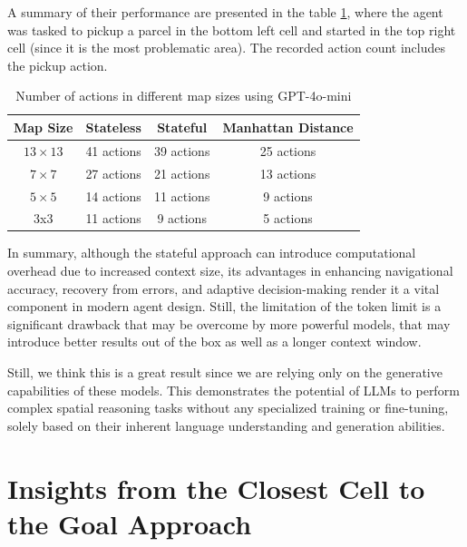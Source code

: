 A summary of their performance are presented in the table \ref{tab:svss}, where
the agent was tasked to pickup a parcel in the bottom left cell and started in
the top right cell (since it is the most problematic area). The recorded action count
includes the pickup action.

\vspace{5mm}
\begin{table}[ht]
  \centering
  \begin{tabular}{c|cc|c}
    \textbf{Map Size} & \textbf{Stateless} & \textbf{Stateful} & \textbf{Manhattan Distance} \\
    \hline
    $13 \times 13$    & 41 actions         & 39 actions        & 25 actions                  \\
    $7 \times 7$      & 27 actions         & 21 actions        & 13 actions                  \\
    $5 \times 5$      & 14 actions         & 11 actions        & 9 actions                   \\
    3x3               & 11 actions         & 9 actions         & 5 actions                   \\
  \end{tabular}
  \caption{Number of actions in different map sizes using GPT-4o-mini}
  \label{tab:svss}
\end{table}
\vspace{5mm}

In summary, although the stateful approach can introduce computational overhead due
to increased context size, its advantages in enhancing navigational accuracy, recovery
from errors, and adaptive decision-making render it a vital component in modern
agent design. Still, the limitation of the token limit is a significant drawback
that may be overcome by more powerful models, that may introduce better results out
of the box as well as a longer context window.

Still, we think this is a great result since we are relying only on the
generative capabilities of these models. This demonstrates the potential of LLMs
to perform complex spatial reasoning tasks without any specialized training or fine-tuning,
solely based on their inherent language understanding and generation abilities.

\section{Insights from the Closest Cell to the Goal Approach}
\label{sec:closest_cell_to_the_goal_results}

